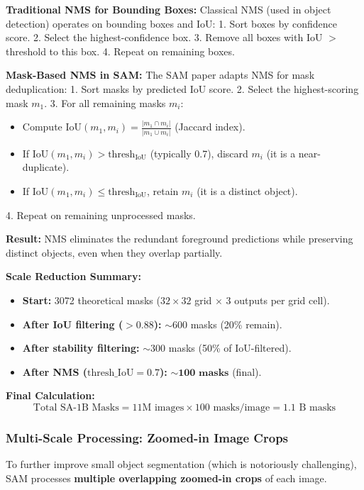 \textbf{Traditional NMS for Bounding Boxes:}
Classical NMS (used in object detection) operates on bounding boxes and IoU:
1. Sort boxes by confidence score.
2. Select the highest-confidence box.
3. Remove all boxes with IoU $>$ threshold to this box.
4. Repeat on remaining boxes.

\textbf{Mask-Based NMS in SAM:}
The SAM paper adapts NMS for mask deduplication:
1. Sort masks by predicted IoU score.
2. Select the highest-scoring mask $m_1$.
3. For all remaining masks $m_i$:
   \begin{itemize}
       \item Compute $\text{IoU}(m_1, m_i) = \frac{|m_1 \cap m_i|}{|m_1 \cup m_i|}$ (Jaccard index).
       \item If $\text{IoU}(m_1, m_i) > \text{thresh}_{\text{IoU}}$ (typically 0.7), discard $m_i$ (it is a near-duplicate).
       \item If $\text{IoU}(m_1, m_i) \leq \text{thresh}_{\text{IoU}}$, retain $m_i$ (it is a distinct object).
   \end{itemize}
4. Repeat on remaining unprocessed masks.

\textbf{Result:} NMS eliminates the redundant foreground predictions while preserving distinct objects, even when they overlap partially.

\textbf{Scale Reduction Summary:}
\begin{itemize}
    \item \textbf{Start:} 3072 theoretical masks ($32 \times 32$ grid $\times$ 3 outputs per grid cell).
    \item \textbf{After IoU filtering ($>0.88$):} $\sim$600 masks (20\% remain).
    \item \textbf{After stability filtering:} $\sim$300 masks (50\% of IoU-filtered).
    \item \textbf{After NMS ($\text{thresh\_IoU} = 0.7$):} $\mathbf{\sim100 \text{ masks}}$ (final).
\end{itemize}

\textbf{Final Calculation:}
\[
\text{Total SA-1B Masks} = 11\text{M images} \times 100 \text{ masks/image} = 1.1 \text{ B masks}
\]

\subsubsection{Multi-Scale Processing: Zoomed-in Image Crops}
To further improve small object segmentation (which is notoriously challenging), SAM processes \textbf{multiple overlapping zoomed-in crops} of each image.

